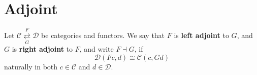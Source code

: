 \documentclass[12pt, oneside]{book}
\begin{document}
\chapter{Adjoint}


\begin{definition}
    Let $\mathcal{C} \underset{G}{\stackrel{F}{\rightleftarrows}} \mathcal{D}$ be categories and functors. We say that $F$ is \textbf{left adjoint} to $G$, and $G$ is \textbf{right adjoint} to $F$, and write $F \dashv G$, if
    \begin{equation*}
        \mathcal{D}(Fc, d) \cong \mathcal{C}(c, Gd)
    \end{equation*}
    naturally in both $c \in \mathcal{C}$ and $d \in \mathcal{D}$.
\end{definition}
\end{document}
